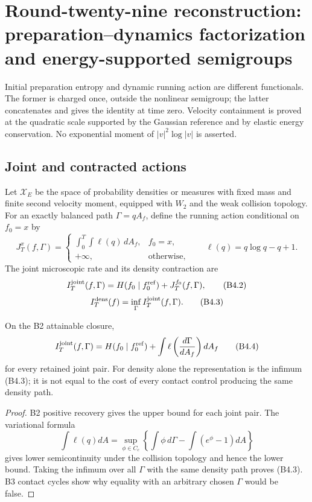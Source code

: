 \section{Round-twenty-nine reconstruction: preparation--dynamics factorization and energy-supported semigroups}
\label{sec:r29-b4}

Initial preparation entropy and dynamic running action are different
functionals.  The former is charged once, outside the nonlinear semigroup; the
latter concatenates and gives the identity at time zero.  Velocity containment
is proved at the quadratic scale supported by the Gaussian reference and by
elastic energy conservation.  No exponential moment of
$|v|^2\log|v|$ is asserted.

\subsection{Joint and contracted actions}

Let $\mathcal X_E$ be the space of probability densities or measures with
fixed mass and finite second velocity moment, equipped with $W_2$ and the
weak collision topology.  For an exactly balanced path
$\Gamma=qA_f$, define the running action conditional on $f_0=x$ by
\[
 J_T^x(f,\Gamma)=
 \begin{cases}
 \displaystyle\int_0^T\!\int\ell(q)\,dA_f,&f_0=x,\\
 +\infty,&\text{otherwise},
 \end{cases}
 \qquad \ell(q)=q\log q-q+1.                              \tag{B4.1}
\]
The joint microscopic rate and its density contraction are
\[
 I_T^{\rm joint}(f,\Gamma)
 =H(f_0\mid f_0^{\rm ref})+J_T^{f_0}(f,\Gamma),            \tag{B4.2}
\]
\[
 I_T^{\rm dens}(f)=\inf_{\Gamma}I_T^{\rm joint}(f,\Gamma). \tag{B4.3}
\]

\begin{proposition}
\label{prop:r29-b4-action}
On the B2 attainable closure,
\[
 I_T^{\rm joint}(f,\Gamma)
 =H(f_0\mid f_0^{\rm ref})+
   \int\ell\left({d\Gamma\over dA_f}\right)dA_f           \tag{B4.4}
\]
for every retained joint pair.  For density alone the representation is the
infimum (B4.3); it is not equal to the cost of every contact control producing
the same density path.
\end{proposition}

\begin{proof}
B2 positive recovery gives the upper bound for each joint pair.  The
variational formula
\[
 \int\ell(q)dA=
 \sup_{\phi\in C_c}\left\{\int\phi\,d\Gamma-
                         \int(e^\phi-1)dA\right\}
\]
gives lower semicontinuity under the collision topology and hence the lower
bound.  Taking the infimum over all $\Gamma$ with the same density path proves
(B4.3).  B3 contact cycles show why equality with an arbitrary chosen
$\Gamma$ would be false.
\end{proof}

